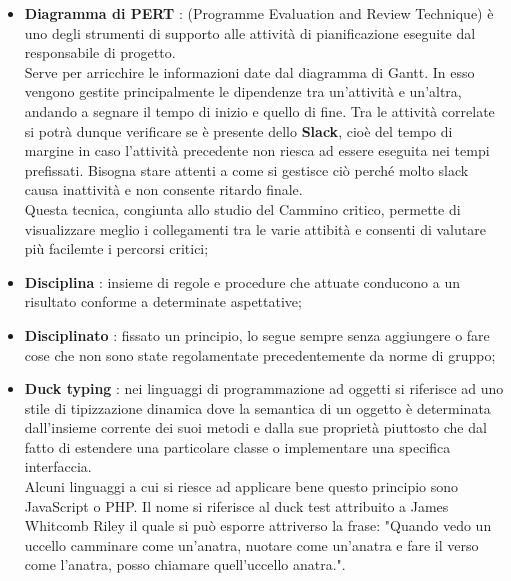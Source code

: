 \begin{itemize}
	\item \textbf {Diagramma di PERT} : (Programme Evaluation and Review Technique) è uno degli strumenti di supporto alle attività di pianificazione eseguite dal responsabile di progetto. \\
Serve per arricchire le informazioni date dal diagramma di Gantt. In esso vengono gestite principalmente le dipendenze tra un'attività e un'altra, andando a segnare il tempo di inizio e quello di fine. Tra le attività correlate si potrà dunque verificare se è presente dello \textbf{Slack}, cioè del tempo di margine in caso l'attività precedente non riesca ad essere eseguita nei tempi prefissati. Bisogna stare attenti a come si gestisce ciò perché molto slack causa inattività e non consente ritardo finale.   \\
Questa tecnica, congiunta allo studio del Cammino critico, permette di visualizzare meglio i collegamenti tra le varie attibità e consenti di valutare più facilemte i percorsi critici;

	\item \textbf{Disciplina} : insieme di regole e procedure che attuate conducono a un risultato conforme a determinate aspettative;
	\item \textbf{Disciplinato} : fissato un principio, lo segue sempre senza aggiungere o fare cose che non sono state regolamentate precedentemente da norme di gruppo;	
	\item \textbf{Duck typing} : nei linguaggi di programmazione ad oggetti si riferisce ad uno stile di tipizzazione dinamica dove la semantica di un oggetto è determinata dall'insieme corrente dei suoi metodi e dalla sue proprietà piuttosto che dal fatto di estendere una particolare classe o implementare una specifica interfaccia. \\
Alcuni linguaggi a cui si riesce ad applicare bene questo principio sono JavaScript o PHP.
Il nome si riferisce al duck test attribuito a James Whitcomb Riley il quale si può esporre attriverso la frase: "Quando vedo un uccello camminare come un'anatra, nuotare come un'anatra e fare il verso come l'anatra, posso chiamare quell'uccello anatra.".

\end{itemize}
